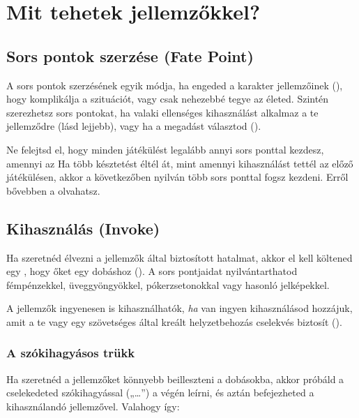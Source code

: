 \section{Mit tehetek jellemzőkkel?}

\subsection[Sors pontok szerzése]{Sors pontok szerzése (Fate Point)}

A sors pontok szerzésének egyik módja, ha engeded a karakter jellemzőinek  (), hogy komplikálja a szituációt, vagy csak nehezebbé tegye az életed. Szintén szerezhetsz sors pontokat, ha valaki ellenséges kihasználást alkalmaz a te jellemződre (lásd lejjebb), vagy ha a megadást választod ().

Ne felejtsd el, hogy minden játékülést legalább annyi sors ponttal kezdesz, amennyi az  Ha több késztetést éltél át, mint amennyi kihasználást tettél az előző játékülésen, akkor a következőben nyilván több sors ponttal fogsz kezdeni. Erről bővebben a  olvahatsz.

\subsection[Kihasználás]{Kihasználás (Invoke)}

Ha szeretnéd élvezni a jellemzők által biztosított hatalmat, akkor el kell költened egy , hogy  őket egy dobáshoz (). A sors pontjaidat nyilvántarthatod fémpénzekkel, üveggyöngyökkel, pókerzsetonokkal vagy hasonló jelképekkel.

A jellemzők ingyenesen is kihasználhatók, \emph{ha} van ingyen kihasználásod hozzájuk, amit a te vagy egy szövetséges által kreált helyzetbehozás cselekvés biztosít ().

\subsubsection{A szókihagyásos trükk}

Ha szeretnéd a jellemzőket könnyebb beilleszteni a dobásokba, akkor próbáld a cselekedeted szókihagyással („…”) a végén leírni, és aztán befejezheted a kihasználandó jellemzővel. Valahogy így:


